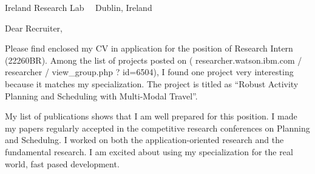 \documentclass{scrlttr2}
\renewcommand{\\}{\ {\large\textperiodcentered}\ }
\begin{document}

\begin{letter}{ %
Ireland Research Lab\\
Dublin, Ireland
}


\opening{Dear Recruiter,}

\setlength{\parskip}{0.4em}

Please find enclosed my CV in application for the position of Research
 Intern (22260BR). Among the list of projects posted on ({\small
 researcher.watson.ibm.com / researcher / view\_group.php ? id=6504}), I
 found one project very interesting because it matches my
 specialization. The project is titled as ``Robust Activity Planning and
 Scheduling with Multi-Modal Travel''.


My list of publications shows that I am well prepared for this
position. I made my papers regularly accepted in the competitive
research conferences on Planning and Schedulng. I worked on both the
application-oriented research and the fundamental research.
I am excited about using my specialization for the real world, fast pased
development.


\end{letter}
\end{document}
